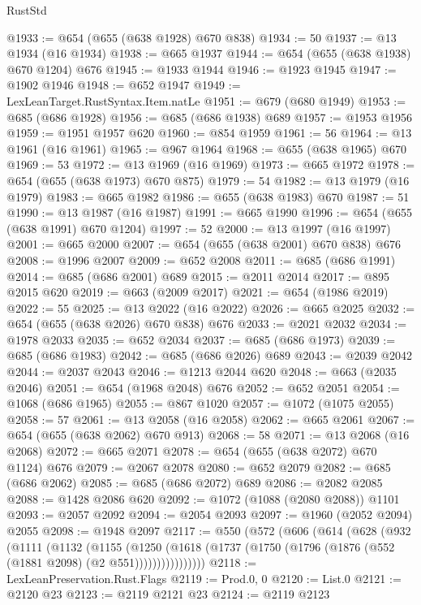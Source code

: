 \begin{lexlean}{RustStd}
\begin{coremodule}
@1933 := @654 (@655 (@638 @1928) @670 @838)
@1934 := 50
@1937 := @13 @1934 (@16 @1934)
@1938 := @665 @1937
@1944 := @654 (@655 (@638 @1938) @670 @1204) @676
@1945 := @1933 @1944
@1946 := @1923 @1945
@1947 := @1902 @1946
@1948 := @652 @1947
@1949 := LexLeanTarget.RustSyntax.Item.natLe
@1951 := @679 (@680 @1949)
@1953 := @685 (@686 @1928)
@1956 := @685 (@686 @1938) @689
@1957 := @1953 @1956
@1959 := @1951 @1957 @620
@1960 := @854 @1959
@1961 := 56
@1964 := @13 @1961 (@16 @1961)
@1965 := @967 @1964
@1968 := @655 (@638 @1965) @670
@1969 := 53
@1972 := @13 @1969 (@16 @1969)
@1973 := @665 @1972
@1978 := @654 (@655 (@638 @1973) @670 @875)
@1979 := 54
@1982 := @13 @1979 (@16 @1979)
@1983 := @665 @1982
@1986 := @655 (@638 @1983) @670
@1987 := 51
@1990 := @13 @1987 (@16 @1987)
@1991 := @665 @1990
@1996 := @654 (@655 (@638 @1991) @670 @1204)
@1997 := 52
@2000 := @13 @1997 (@16 @1997)
@2001 := @665 @2000
@2007 := @654 (@655 (@638 @2001) @670 @838) @676
@2008 := @1996 @2007
@2009 := @652 @2008
@2011 := @685 (@686 @1991)
@2014 := @685 (@686 @2001) @689
@2015 := @2011 @2014
@2017 := @895 @2015 @620
@2019 := @663 (@2009 @2017)
@2021 := @654 (@1986 @2019)
@2022 := 55
@2025 := @13 @2022 (@16 @2022)
@2026 := @665 @2025
@2032 := @654 (@655 (@638 @2026) @670 @838) @676
@2033 := @2021 @2032
@2034 := @1978 @2033
@2035 := @652 @2034
@2037 := @685 (@686 @1973)
@2039 := @685 (@686 @1983)
@2042 := @685 (@686 @2026) @689
@2043 := @2039 @2042
@2044 := @2037 @2043
@2046 := @1213 @2044 @620
@2048 := @663 (@2035 @2046)
@2051 := @654 (@1968 @2048) @676
@2052 := @652 @2051
@2054 := @1068 (@686 @1965)
@2055 := @867 @1020
@2057 := @1072 (@1075 @2055)
@2058 := 57
@2061 := @13 @2058 (@16 @2058)
@2062 := @665 @2061
@2067 := @654 (@655 (@638 @2062) @670 @913)
@2068 := 58
@2071 := @13 @2068 (@16 @2068)
@2072 := @665 @2071
@2078 := @654 (@655 (@638 @2072) @670 @1124) @676
@2079 := @2067 @2078
@2080 := @652 @2079
@2082 := @685 (@686 @2062)
@2085 := @685 (@686 @2072) @689
@2086 := @2082 @2085
@2088 := @1428 @2086 @620
@2092 := @1072 (@1088 (@2080 @2088)) @1101
@2093 := @2057 @2092
@2094 := @2054 @2093
@2097 := @1960 (@2052 @2094) @2055
@2098 := @1948 @2097
@2117 := @550
    (@572
      (@606
        (@614
          (@628
            (@932
              (@1111
                (@1132
                  (@1155
                    (@1250
                      (@1618
                        (@1737 (@1750 (@1796 (@1876 (@552 (@1881 @2098) (@2 @551))))))))))))))))
@2118 := LexLeanPreservation.Rust.Flags
@2119 := Prod.{0, 0}
@2120 := List.{0}
@2121 := @2120 @23
@2123 := @2119 @2121 @23
@2124 := @2119 @2123

\end{coremodule}
\end{lexlean}
